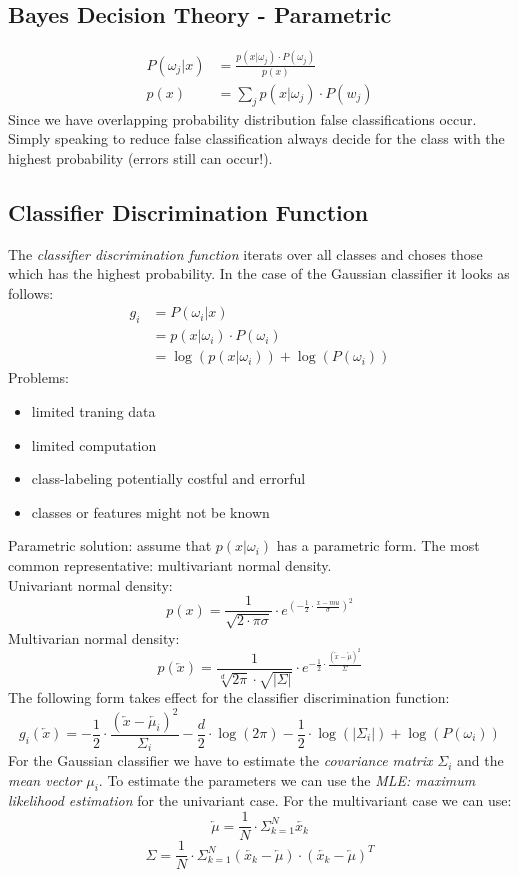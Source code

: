 \subsection{Bayes Decision Theory - Parametric}
\label{ssect:bayes-decision-theory}
\begin{align*}
P(\omega_j |x) &= \frac{p(x|\omega_j) \cdot P(\omega_j)}{p(x)} \\
p(x) &= \sum_j p(x|\omega_j) \cdot P(w_j)
\end{align*}
Since we have overlapping probability distribution false classifications occur. Simply speaking to reduce false classification always decide for the class with the highest probability (errors still can occur!).

\subsection{Classifier Discrimination Function}
\label{ssect:classfier-discrimination-function}
The \textit{classifier discrimination function} iterats over all classes and choses those which has the highest probability. In the case of the Gaussian classifier it looks as follows:
\begin{align*}
g_i &= P(\omega_i | x) \\
&= p(x | \omega_i) \cdot P(\omega_i) \\
&= \log(p(x | \omega_i)) + \log(P(\omega_i))
\end{align*}
Problems:
\begin{itemize}
	\item limited traning data
	\item limited computation
	\item class-labeling potentially costful and errorful
	\item classes or features might not be known
\end{itemize}
Parametric solution: assume that $p(x|\omega_i)$ has a parametric form. The most common representative: multivariant normal density.\\
Univariant normal density:
\[
p(x) = \frac{1}{\sqrt{2 \cdot \pi \sigma}} \cdot e^{(-\frac{1}{2} \cdot \frac{x - mu}{\sigma})^2}
\]
Multivarian normal density:
\[
p(\overleftarrow{x}) = \frac{1}{\sqrt[d]{2 \pi} \cdot \sqrt{|\Sigma|}} \cdot e^{-\frac{1}{2} \cdot \frac{(\overleftarrow{x} - \overleftarrow{\mu})^2}{\Sigma}}
\]
The following form takes effect for the classifier discrimination function:
\[
g_i(\overleftarrow{x}) = -\frac{1}{2} \cdot \frac{(\overleftarrow{x} - \overleftarrow{\mu_i})^2}{\Sigma_i} - \frac{d}{2} \cdot \log(2\pi) - \frac{1}{2} \cdot \log(|\Sigma_i|) + \log(P(\omega_i))
\]
For the Gaussian classifier we have to estimate the \textit{covariance matrix} $\Sigma_i$ and the \textit{mean vector} $\mu_i$. To estimate the parameters we can use the \textit{MLE: maximum likelihood estimation} for the univariant case.
For the multivariant case we can use:
\[
\overleftarrow{\mu} = \frac{1}{N} \cdot \Sigma_{k = 1}^{N} \overleftarrow{x_k}
\]
\[
\Sigma = \frac{1}{N} \cdot \Sigma_{k = 1}^{N} (\overleftarrow{x_k} - \overleftarrow{\mu}) \cdot (\overleftarrow{x_k} - \overleftarrow{\mu})^T
\]
